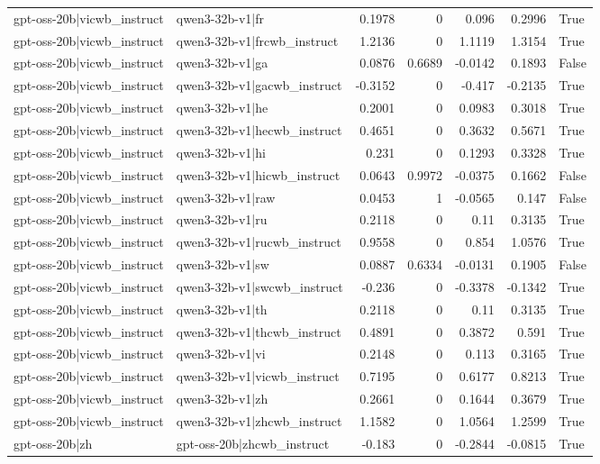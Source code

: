 \begin{table}
\begin{tabular}{l l r r r r l}
gpt-oss-20b|vicwb_instruct & qwen3-32b-v1|fr & 0.1978 & 0 & 0.096 & 0.2996 & True \\
gpt-oss-20b|vicwb_instruct & qwen3-32b-v1|frcwb_instruct & 1.2136 & 0 & 1.1119 & 1.3154 & True \\
gpt-oss-20b|vicwb_instruct & qwen3-32b-v1|ga & 0.0876 & 0.6689 & -0.0142 & 0.1893 & False \\
gpt-oss-20b|vicwb_instruct & qwen3-32b-v1|gacwb_instruct & -0.3152 & 0 & -0.417 & -0.2135 & True \\
gpt-oss-20b|vicwb_instruct & qwen3-32b-v1|he & 0.2001 & 0 & 0.0983 & 0.3018 & True \\
gpt-oss-20b|vicwb_instruct & qwen3-32b-v1|hecwb_instruct & 0.4651 & 0 & 0.3632 & 0.5671 & True \\
gpt-oss-20b|vicwb_instruct & qwen3-32b-v1|hi & 0.231 & 0 & 0.1293 & 0.3328 & True \\
gpt-oss-20b|vicwb_instruct & qwen3-32b-v1|hicwb_instruct & 0.0643 & 0.9972 & -0.0375 & 0.1662 & False \\
gpt-oss-20b|vicwb_instruct & qwen3-32b-v1|raw & 0.0453 & 1 & -0.0565 & 0.147 & False \\
gpt-oss-20b|vicwb_instruct & qwen3-32b-v1|ru & 0.2118 & 0 & 0.11 & 0.3135 & True \\
gpt-oss-20b|vicwb_instruct & qwen3-32b-v1|rucwb_instruct & 0.9558 & 0 & 0.854 & 1.0576 & True \\
gpt-oss-20b|vicwb_instruct & qwen3-32b-v1|sw & 0.0887 & 0.6334 & -0.0131 & 0.1905 & False \\
gpt-oss-20b|vicwb_instruct & qwen3-32b-v1|swcwb_instruct & -0.236 & 0 & -0.3378 & -0.1342 & True \\
gpt-oss-20b|vicwb_instruct & qwen3-32b-v1|th & 0.2118 & 0 & 0.11 & 0.3135 & True \\
gpt-oss-20b|vicwb_instruct & qwen3-32b-v1|thcwb_instruct & 0.4891 & 0 & 0.3872 & 0.591 & True \\
gpt-oss-20b|vicwb_instruct & qwen3-32b-v1|vi & 0.2148 & 0 & 0.113 & 0.3165 & True \\
gpt-oss-20b|vicwb_instruct & qwen3-32b-v1|vicwb_instruct & 0.7195 & 0 & 0.6177 & 0.8213 & True \\
gpt-oss-20b|vicwb_instruct & qwen3-32b-v1|zh & 0.2661 & 0 & 0.1644 & 0.3679 & True \\
gpt-oss-20b|vicwb_instruct & qwen3-32b-v1|zhcwb_instruct & 1.1582 & 0 & 1.0564 & 1.2599 & True \\
gpt-oss-20b|zh & gpt-oss-20b|zhcwb_instruct & -0.183 & 0 & -0.2844 & -0.0815 & True \\

\end{tabular}
\end{table}
